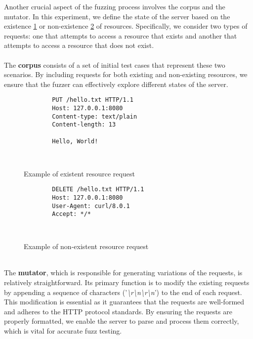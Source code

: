 Another crucial aspect of the fuzzing process involves the corpus and the mutator. In this experiment, we define the state of the server based on the existence \ref{tab:existent_resource} or non-existence \ref{tab:nonexistent_resource} of resources. Specifically, we consider two types of requests: one that attempts to access a resource that exists and another that attempts to access a resource that does not exist.
\\\\The \textbf{corpus} consists of a set of initial test cases that represent these two scenarios. By including requests for both existing and non-existing resources, we ensure that the fuzzer can effectively explore different states of the server.
\begin{figure}[H]
    \centering
    \begin{adjustbox}{valign=t}
    \begin{lstlisting}
        PUT /hello.txt HTTP/1.1
        Host: 127.0.0.1:8080
        Content-type: text/plain
        Content-length: 13
    
        Hello, World!

    
    \end{lstlisting}
    \end{adjustbox}
    \caption{Example of existent resource request}
    \label{tab:existent_resource}
\end{figure}
    
\begin{figure}[H]
    \centering
    \begin{adjustbox}{valign=t}
    \begin{lstlisting}
        DELETE /hello.txt HTTP/1.1
        Host: 127.0.0.1:8080
        User-Agent: curl/8.0.1
        Accept: */*
    
    
    \end{lstlisting}
    \end{adjustbox}
    \caption{Example of non-existent resource request}
    \label{tab:nonexistent_resource}
\end{figure}
\phantom{}\\
The \textbf{mutator}, which is responsible for generating variations of the requests, is relatively straightforward. Its primary function is to modify the existing requests by appending a sequence of characters ('\textit{\textbackslash r\textbackslash n\textbackslash r\textbackslash n}') to the end of each request. This modification is essential as it guarantees that the requests are well-formed and adheres to the HTTP protocol standards. By ensuring the requests are properly formatted, we enable the server to parse and process them correctly, which is vital for accurate fuzz testing.

